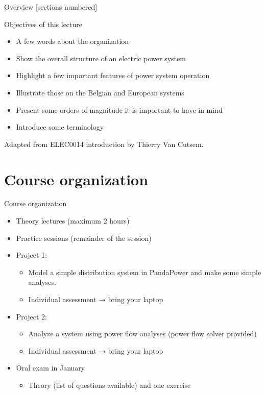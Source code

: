 \titleframe





\begin{frame}{Overview}
  [sections numbered]
  \tableofcontents[hideallsubsections]
\end{frame}




\begin{frame} {Objectives of this lecture}
\begin{itemize}
\item A few words about the organization
\item Show the overall structure of an electric power system
\item Highlight a few important features of power system operation
\item Illustrate those on the Belgian and European systems
\item Present some orders of magnitude it is important to have in mind
\item Introduce some terminology
\end{itemize}
\vfill
\small{Adapted from ELEC0014 introduction by Thierry Van Cutsem.}
\end{frame}

\section{Course organization}


\begin{frame}
{Course organization}
\begin{itemize}
\item Theory lectures (maximum 2 hours)
\item Practice sessions (remainder of the session)
\item Project 1:
\begin{itemize}
\item Model a simple distribution system in PandaPower and make some simple analyses.
\item \alert{Individual assessment → bring your laptop}
\end{itemize}
\item Project 2:
\begin{itemize}
\item Analyze a system using power flow analyses (power flow solver provided)
\item \alert{Individual assessment → bring your laptop}
\end{itemize}
\item Oral exam in January
\begin{itemize}
\item Theory (list of questions available) and one exercise
\end{itemize}
\end{itemize}
\end{frame}

